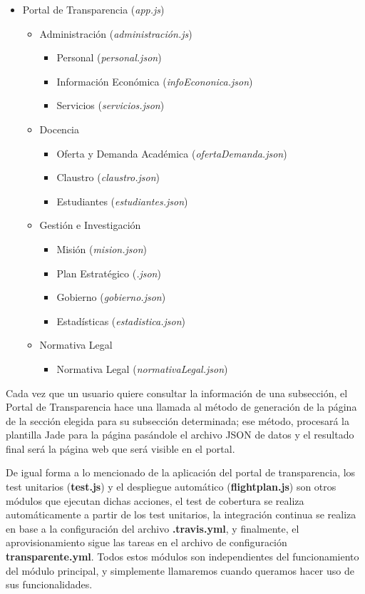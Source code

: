 \begin{itemize}
 \item Portal de Transparencia (\textit{app.js})
 \begin{itemize}
  \item Administración (\textit{administración.js})
  \begin{itemize}
   \item Personal (\textit{personal.json})
   \item Información Económica (\textit{infoEcononica.json})
   \item Servicios (\textit{servicios.json})
  \end{itemize}
  \item Docencia
  \begin{itemize}
   \item Oferta y Demanda Académica (\textit{ofertaDemanda.json})
   \item Claustro (\textit{claustro.json})
   \item Estudiantes (\textit{estudiantes.json})
  \end{itemize}
  \item Gestión e Investigación
  \begin{itemize}
   \item Misión (\textit{mision.json})
   \item Plan Estratégico (\textit{.json})
   \item Gobierno (\textit{gobierno.json})
   \item Estadísticas (\textit{estadistica.json})
  \end{itemize}
  \item Normativa Legal
  \begin{itemize}
   \item Normativa Legal (\textit{normativaLegal.json})
  \end{itemize}
 \end{itemize}
\end{itemize}

Cada vez que un usuario quiere consultar la información de una subsección, el Portal de Transparencia hace una llamada al método
de generación de la página de la sección elegida para su subsección determinada; ese método, procesará la plantilla Jade para la
página pasándole el archivo JSON de datos y el resultado final será la página web que será visible en el portal.

\bigskip
De igual forma a lo mencionado de la aplicación del portal de transparencia, los test unitarios (\textbf{test.js}) y el 
despliegue automático (\textbf{flightplan.js}) son otros módulos que ejecutan dichas acciones, el test de cobertura se realiza
automáticamente a partir de los test unitarios, la integración continua se realiza en base a la configuración del archivo 
\textbf{.travis.yml}, y finalmente, el aprovisionamiento sigue las tareas en el archivo de configuración 
\textbf{transparente.yml}. Todos estos módulos son independientes del funcionamiento del módulo principal, y simplemente 
llamaremos cuando queramos hacer uso de sus funcionalidades.